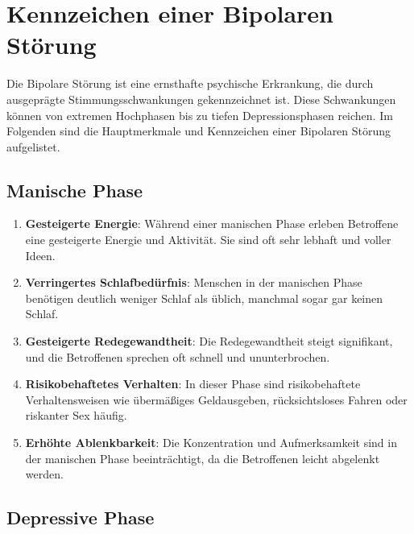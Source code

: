 \section{Kennzeichen einer Bipolaren Störung}

Die Bipolare Störung ist eine ernsthafte psychische Erkrankung, die durch ausgeprägte Stimmungsschwankungen gekennzeichnet ist. Diese Schwankungen können von extremen Hochphasen bis zu tiefen Depressionsphasen reichen. Im Folgenden sind die Hauptmerkmale und Kennzeichen einer Bipolaren Störung aufgelistet.

\subsection{Manische Phase}

\begin{enumerate}
\item \textbf{Gesteigerte Energie}: Während einer manischen Phase erleben Betroffene eine gesteigerte Energie und Aktivität. Sie sind oft sehr lebhaft und voller Ideen.

\item \textbf{Verringertes Schlafbedürfnis}: Menschen in der manischen Phase benötigen deutlich weniger Schlaf als üblich, manchmal sogar gar keinen Schlaf.

\item \textbf{Gesteigerte Redegewandtheit}: Die Redegewandtheit steigt signifikant, und die Betroffenen sprechen oft schnell und ununterbrochen.

\item \textbf{Risikobehaftetes Verhalten}: In dieser Phase sind risikobehaftete Verhaltensweisen wie übermäßiges Geldausgeben, rücksichtsloses Fahren oder riskanter Sex häufig.

\item \textbf{Erhöhte Ablenkbarkeit}: Die Konzentration und Aufmerksamkeit sind in der manischen Phase beeinträchtigt, da die Betroffenen leicht abgelenkt werden.
\end{enumerate}

\subsection{Depressive Phase}

